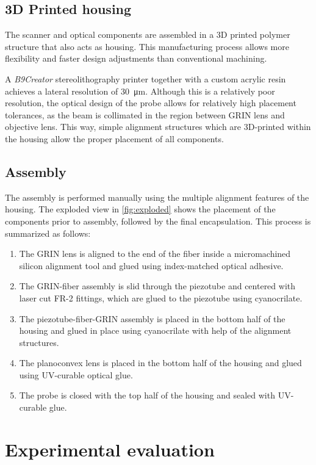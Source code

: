 \documentclass[10pt]{iopart}
\begin{document}
\subsection{3D Printed housing}
The scanner and optical components are assembled in a 3D printed polymer structure that also acts as housing. This manufacturing process allows more flexibility and faster design adjustments than conventional machining. 

A \textit{B9Creator} stereolithography printer together with a custom acrylic resin achieves a lateral resolution of \SI{30}{\micro\meter}. Although this is a relatively poor resolution, the optical design of the probe allows for relatively high placement tolerances, as the beam is collimated in the region between GRIN lens and objective lens. This way, simple alignment structures which are 3D-printed within the housing allow the proper placement of all components.

\subsection{Assembly}
The assembly is performed manually using the multiple alignment features of the housing. The exploded view in \autoref{fig:exploded} shows the placement of the components prior to assembly, followed by the final encapsulation. This process is summarized as follows:

\begin{enumerate}
\item The GRIN lens is aligned to the end of the fiber inside a micromachined silicon alignment tool and glued using index-matched optical adhesive.
\item The GRIN-fiber assembly is slid through the piezotube and centered with laser cut FR-2 fittings, which are glued to the piezotube using cyanocrilate.
\item The piezotube-fiber-GRIN assembly is placed in the bottom half of the housing and glued in place using cyanocrilate with help of the alignment structures.
\item The planoconvex lens is placed in the bottom half of the housing and glued using UV-curable optical glue.
\item The probe is closed with the top half of the housing and sealed with UV-curable glue.
\end{enumerate}


\section{Experimental evaluation}
\end{document}

